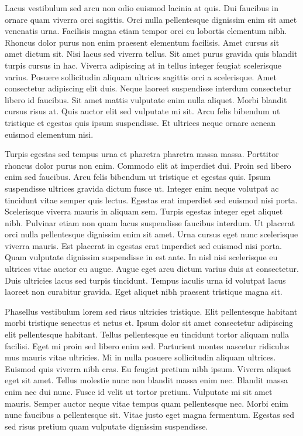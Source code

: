 Lacus vestibulum sed arcu non odio euismod lacinia at quis. Dui faucibus in ornare quam viverra orci sagittis. Orci nulla pellentesque dignissim enim sit amet venenatis urna. Facilisis magna etiam tempor orci eu lobortis elementum nibh. Rhoncus dolor purus non enim praesent elementum facilisis. Amet cursus sit amet dictum sit. Nisi lacus sed viverra tellus. Sit amet purus gravida quis blandit turpis cursus in hac. Viverra adipiscing at in tellus integer feugiat scelerisque varius. Posuere sollicitudin aliquam ultrices sagittis orci a scelerisque. Amet consectetur adipiscing elit duis. Neque laoreet suspendisse interdum consectetur libero id faucibus. Sit amet mattis vulputate enim nulla aliquet. Morbi blandit cursus risus at. Quis auctor elit sed vulputate mi sit. Arcu felis bibendum ut tristique et egestas quis ipsum suspendisse. Et ultrices neque ornare aenean euismod elementum nisi.

Turpis egestas sed tempus urna et pharetra pharetra massa massa. Porttitor rhoncus dolor purus non enim. Commodo elit at imperdiet dui. Proin sed libero enim sed faucibus. Arcu felis bibendum ut tristique et egestas quis. Ipsum suspendisse ultrices gravida dictum fusce ut. Integer enim neque volutpat ac tincidunt vitae semper quis lectus. Egestas erat imperdiet sed euismod nisi porta. Scelerisque viverra mauris in aliquam sem. Turpis egestas integer eget aliquet nibh. Pulvinar etiam non quam lacus suspendisse faucibus interdum. Ut placerat orci nulla pellentesque dignissim enim sit amet. Urna cursus eget nunc scelerisque viverra mauris. Est placerat in egestas erat imperdiet sed euismod nisi porta. Quam vulputate dignissim suspendisse in est ante. In nisl nisi scelerisque eu ultrices vitae auctor eu augue. Augue eget arcu dictum varius duis at consectetur. Duis ultricies lacus sed turpis tincidunt. Tempus iaculis urna id volutpat lacus laoreet non curabitur gravida. Eget aliquet nibh praesent tristique magna sit.

Phasellus vestibulum lorem sed risus ultricies tristique. Elit pellentesque habitant morbi tristique senectus et netus et. Ipsum dolor sit amet consectetur adipiscing elit pellentesque habitant. Tellus pellentesque eu tincidunt tortor aliquam nulla facilisi. Eget mi proin sed libero enim sed. Parturient montes nascetur ridiculus mus mauris vitae ultricies. Mi in nulla posuere sollicitudin aliquam ultrices. Euismod quis viverra nibh cras. Eu feugiat pretium nibh ipsum. Viverra aliquet eget sit amet. Tellus molestie nunc non blandit massa enim nec. Blandit massa enim nec dui nunc. Fusce id velit ut tortor pretium. Vulputate mi sit amet mauris. Semper auctor neque vitae tempus quam pellentesque nec. Morbi enim nunc faucibus a pellentesque sit. Vitae justo eget magna fermentum. Egestas sed sed risus pretium quam vulputate dignissim suspendisse.
